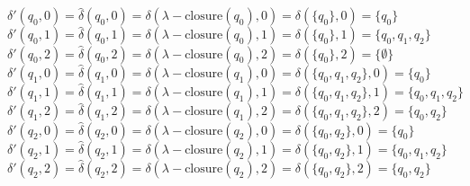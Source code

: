 \documentclass{report}
\begin{document}

\pagebreak
\noindent $\delta'(q_0,0) = \hat{\delta}(q_0,0) = \delta(\lambda-\mathrm{closure}(q_0),0) = \delta(\{ q_0 \},0) = \{ q_0 \}$\\
$\delta'(q_0,1) = \hat{\delta}(q_0,1) = \delta(\lambda-\mathrm{closure}(q_0),1) = \delta(\{ q_0 \},1) = \{ q_0, q_1, q_2 \}$\\
$\delta'(q_0,2) = \hat{\delta}(q_0,2) = \delta(\lambda-\mathrm{closure}(q_0),2) = \delta(\{ q_0 \},2) = \{ \emptyset \}$\\
$\delta'(q_1,0) = \hat{\delta}(q_1,0) = \delta(\lambda-\mathrm{closure}(q_1),0) = \delta(\{ q_0, q_1, q_2 \},0) = \{ q_0 \}$\\
$\delta'(q_1,1) = \hat{\delta}(q_1,1) = \delta(\lambda-\mathrm{closure}(q_1),1) = \delta(\{ q_0, q_1, q_2 \},1) = \{ q_0, q_1, q_2 \}$\\
$\delta'(q_1,2) = \hat{\delta}(q_1,2) = \delta(\lambda-\mathrm{closure}(q_1),2) = \delta(\{ q_0, q_1, q_2 \},2) = \{ q_0, q_2 \}$\\
$\delta'(q_2,0) = \hat{\delta}(q_2,0) = \delta(\lambda-\mathrm{closure}(q_2),0) = \delta(\{ q_0, q_2 \},0) = \{ q_0 \}$\\
$\delta'(q_2,1) = \hat{\delta}(q_2,1) = \delta(\lambda-\mathrm{closure}(q_2),1) = \delta(\{ q_0, q_2 \},1) = \{ q_0, q_1, q_2 \}$\\
$\delta'(q_2,2) = \hat{\delta}(q_2,2) = \delta(\lambda-\mathrm{closure}(q_2),2) = \delta(\{ q_0, q_2 \},2) = \{ q_0, q_2 \}$\\
\end{document}
